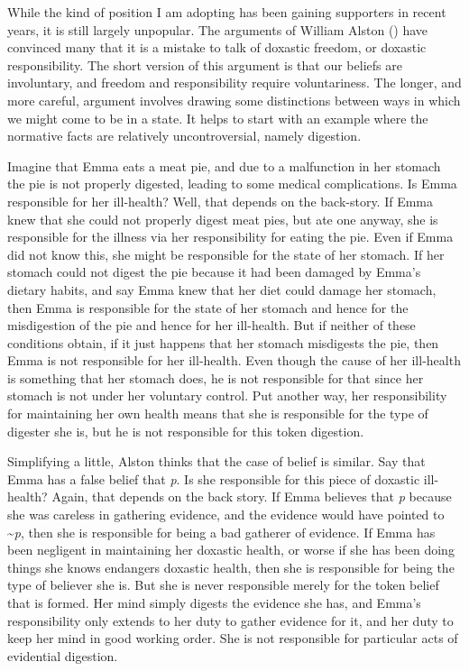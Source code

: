 \documentclass[
  10pt,
  letterpaper,
  DIV=11,
  numbers=noendperiod,
  twoside]{scrartcl}
\begin{document}
While the kind of position I am adopting has been gaining supporters in
recent years, it is still largely unpopular. The arguments of William
Alston () have convinced many that it is
a mistake to talk of doxastic freedom, or doxastic responsibility. The
short version of this argument is that our beliefs are involuntary, and
freedom and responsibility require voluntariness. The longer, and more
careful, argument involves drawing some distinctions between ways in
which we might come to be in a state. It helps to start with an example
where the normative facts are relatively uncontroversial, namely
digestion.

Imagine that Emma eats a meat pie, and due to a malfunction in her
stomach the pie is not properly digested, leading to some medical
complications. Is Emma responsible for her ill-health? Well, that
depends on the back-story. If Emma knew that she could not properly
digest meat pies, but ate one anyway, she is responsible for the illness
via her responsibility for eating the pie. Even if Emma did not know
this, she might be responsible for the state of her stomach. If her
stomach could not digest the pie because it had been damaged by Emma's
dietary habits, and say Emma knew that her diet could damage her
stomach, then Emma is responsible for the state of her stomach and hence
for the misdigestion of the pie and hence for her ill-health. But if
neither of these conditions obtain, if it just happens that her stomach
misdigests the pie, then Emma is not responsible for her ill-health.
Even though the cause of her ill-health is something that her stomach
does, he is not responsible for that since her stomach is not under her
voluntary control. Put another way, her responsibility for maintaining
her own health means that she is responsible for the type of digester
she is, but he is not responsible for this token digestion.

Simplifying a little, Alston thinks that the case of belief is similar.
Say that Emma has a false belief that \emph{p}. Is she responsible for
this piece of doxastic ill-health? Again, that depends on the back
story. If Emma believes that \emph{p} because she was careless in
gathering evidence, and the evidence would have pointed to
\textasciitilde{}\emph{p}, then she is responsible for being a bad
gatherer of evidence. If Emma has been negligent in maintaining her
doxastic health, or worse if she has been doing things she knows
endangers doxastic health, then she is responsible for being the type of
believer she is. But she is never responsible merely for the token
belief that is formed. Her mind simply digests the evidence she has, and
Emma's responsibility only extends to her duty to gather evidence for
it, and her duty to keep her mind in good working order. She is not
responsible for particular acts of evidential digestion.
\end{document}
